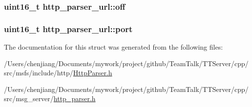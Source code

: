 \subsubsection[{off}]{\setlength{\rightskip}{0pt plus 5cm}uint16\+\_\+t http\+\_\+parser\+\_\+url\+::off}\label{structhttp__parser__url_a6510826f3aa9a1100ac5f714323edeb1}
\hypertarget{structhttp__parser__url_a875fb8faf3ee45707078eda5435fa563}{}
\subsubsection[{port}]{\setlength{\rightskip}{0pt plus 5cm}uint16\+\_\+t http\+\_\+parser\+\_\+url\+::port}\label{structhttp__parser__url_a875fb8faf3ee45707078eda5435fa563}


The documentation for this struct was generated from the following files\+:\begin{DoxyCompactItemize}
\item 
/\+Users/chenjiang/\+Documents/mywork/project/github/\+Team\+Talk/\+T\+T\+Server/cpp/src/msfs/include/http/\hyperlink{_http_parser_8h}{Http\+Parser.\+h}\item 
/\+Users/chenjiang/\+Documents/mywork/project/github/\+Team\+Talk/\+T\+T\+Server/cpp/src/msg\+\_\+server/\hyperlink{http__parser_8h}{http\+\_\+parser.\+h}\end{DoxyCompactItemize}
